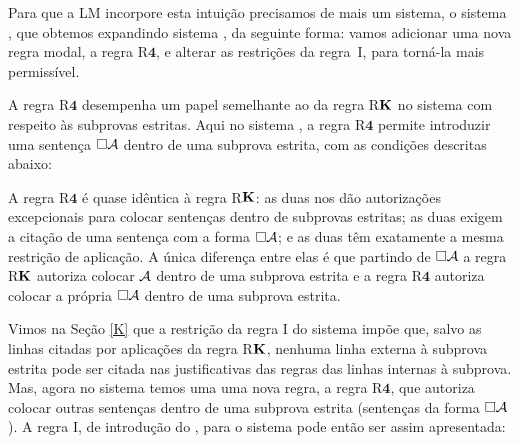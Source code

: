 Para que a LM incorpore esta intuição precisamos de mais um sistema, o sistema  \mlSfour{},  que obtemos expandindo sistema  \mlT{}, da seguinte forma: vamos adicionar uma nova regra modal,  a regra R$\mathbf{4}$,  e alterar  as restrições da regra~\ebox I, para torná-la mais permissível.

A regra R$\mathbf{4}$ desempenha um papel semelhante ao da regra R$\mathbf{K}$  no sistema \mlK{}  com respeito às subprovas estritas.  Aqui no sistema \mlSfour{}, a regra R$\mathbf{4}$  permite introduzir uma sentença $\Box \mathcal{A}$ dentro de uma subprova estrita,  com as condições descritas abaixo:
 


A regra R$\mathbf{4}$ é quase idêntica à regra R$\mathbf{K}$: as duas nos dão autorizações excepcionais para colocar sentenças dentro de subprovas estritas; as duas exigem a citação de uma sentença com a forma $\Box \mathcal{A}$; e as duas têm exatamente a mesma restrição de aplicação. A única diferença entre elas é que partindo de $\Box \mathcal{A}$ a regra R$\mathbf{K}$ autoriza colocar $\mathcal{A}$ dentro de uma subprova estrita e a regra R$\mathbf{4}$ autoriza colocar a própria $\Box \mathcal{A}$ dentro de uma subprova estrita.

Vimos na Seção \ref{K} 
 que a restrição da regra  \ebox I do sistema \mlK{}  impõe que,  salvo as linhas citadas por aplicações da regra R$\mathbf{K}$, nenhuma linha externa à subprova estrita pode ser citada nas justificativas das regras das linhas internas à subprova.  Mas, agora no sistema \mlSfour{} temos uma uma nova regra, a regra R$\mathbf{4}$,  que  autoriza colocar outras sentenças  dentro de uma subprova estrita (sentenças da forma $\Box\mathcal{A}$ ).  A regra \ebox I, de introdução do \ebox, para  o sistema  \mlSfour{}  pode então ser assim apresentada:




